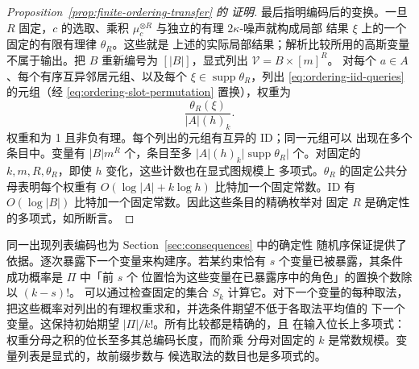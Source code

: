 \begin{proof}[Proposition~\ref{prop:finite-ordering-transfer} 的
证明]
最后指明编码后的变换。一旦 \(R\) 固定，\(c\) 的选取、乘积
\(\mu_c^{\otimes R}\) 与独立的有理 \(2\kappa\)-噪声就构成局部
结果 \(\xi\) 上的一个固定的有限有理律 \(\theta_R\)。这些就是
上述的实际局部结果；解析比较所用的高斯变量不属于输出。把 \(B\)
重新编号为 \([|B|]\)，显式列出 \(\mathcal V=B\times[m]^R\)。
对每个 \(a\in A\)、每个有序互异邻居元组、以及每个
\(\xi\in\operatorname{supp}\theta_R\)，列出
\eqref{eq:ordering-iid-queries} 的元组（经
\eqref{eq:ordering-slot-permutation} 置换），权重为
\begin{equation}
 \frac{\theta_R(\xi)}{|A|(h)_k}.
\label{eq:ordering-rational-weight}
\end{equation}
权重和为 1 且非负有理。每个列出的元组有互异的 ID；同一元组可以
出现在多个条目中。变量有 \(|B|m^R\) 个，条目至多
\(|A|(h)_k|\operatorname{supp}\theta_R|\) 个。对固定的
\(k,m,R,\theta_R\)，即使 \(h\) 变化，这些计数也在显式图规模上
多项式。\(\theta_R\) 的固定公共分母表明每个权重有
\(O(\log|A|+k\log h)\) 比特加一个固定常数。ID 有
\(O(\log|B|)\) 比特加一个固定常数。因此这些条目的精确枚举对
固定 \(R\) 是确定性的多项式，如所断言。
\end{proof}

同一出现列表编码也为 Section~\ref{sec:consequences} 中的确定性
随机序保证提供了依据。逐次暴露下一个变量来构建序。若某约束恰有
\(s\) 个变量已被暴露，其条件成功概率是 \(\Pi\) 中「前 \(s\) 个
位置恰为这些变量在已暴露序中的角色」的置换个数除以 \((k-s)!\)。
可以通过检查固定的集合 \(S_k\) 计算它。对下一个变量的每种取法，
把这些概率对列出的有理权重求和，并选条件期望不低于各取法平均值的
下一个变量。这保持初始期望 \(|\Pi|/k!\)。所有比较都是精确的，且
在输入位长上多项式：权重分母之积的位长至多其总编码长度，而阶乘
分母对固定的 \(k\) 是常数规模。变量列表是显式的，故前缀步数与
候选取法的数目也是多项式的。

